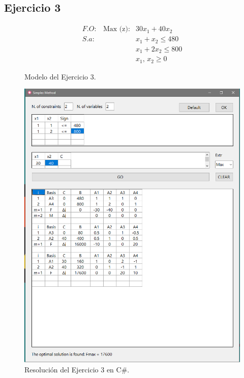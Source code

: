 \documentclass[a4paper, 12pt]{article}
\begin{document}
    \subsection{Ejercicio 3}
    \begin{figure}[H]
        \[\begin{matrix}
            F\!.\!O:&\text{Max (z)}:&30x_1+40x_2\\
            S.\!a: &&x_1+x_2\leq 480\\
            &&x_1+2x_2\leq 800\\
            &&x_1,\,x_2\geq 0
        \end{matrix}\]
        \caption{Modelo del Ejercicio 3.}
    \end{figure}
    \begin{figure}[H]
        \centering
        \includegraphics[width=12cm]{ejercicio3.PNG}
        \caption{Resolución del Ejercicio 3 en C\#.}
    \end{figure}
\end{document}
